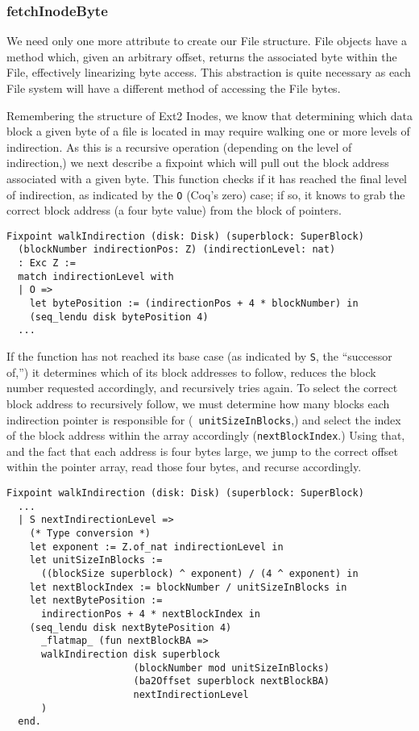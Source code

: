 \documentclass[nocopyrightspace]{sigplanconf}
\begin{document}
\subsubsection{fetchInodeByte}

We need only one more attribute to create our File structure. File objects
have a method which, given an arbitrary offset, returns the associated byte
within the File, effectively linearizing byte access. This abstraction is
quite necessary as each File system will have a different method of accessing
the File bytes.

Remembering the structure of Ext2 Inodes, we know that determining which data
block a given byte of a file is located in may require walking one or more
levels of indirection. As this is a recursive operation (depending on the
level of indirection,) we next describe a fixpoint which will pull out the
block address associated with a given byte. This function checks if it has
reached the final level of indirection, as indicated by the {\tt O} (Coq's
zero) case; if so, it knows to grab the correct block address (a four byte
value) from the block of pointers.

\begin{lstlisting}
Fixpoint walkIndirection (disk: Disk) (superblock: SuperBlock)
  (blockNumber indirectionPos: Z) (indirectionLevel: nat) 
  : Exc Z :=
  match indirectionLevel with
  | O => 
    let bytePosition := (indirectionPos + 4 * blockNumber) in
    (seq_lendu disk bytePosition 4)
  ...
\end{lstlisting}

If the function has not reached its base case (as indicated by {\tt S}, the
``successor of,'') it determines which of its block addresses to follow,
reduces the block number requested accordingly, and recursively tries again.
To select the correct block address to recursively follow, we must determine
how many blocks each indirection pointer is responsible for ({\tt
unitSizeInBlocks},) and select the index of the block address within the array
accordingly ({\tt nextBlockIndex}.) Using that, and the fact that each address
is four bytes large, we jump to the correct offset within the pointer array,
read those four bytes, and recurse accordingly.

\begin{lstlisting}
Fixpoint walkIndirection (disk: Disk) (superblock: SuperBlock)
  ...
  | S nextIndirectionLevel =>
    (* Type conversion *)
    let exponent := Z.of_nat indirectionLevel in
    let unitSizeInBlocks := 
      ((blockSize superblock) ^ exponent) / (4 ^ exponent) in
    let nextBlockIndex := blockNumber / unitSizeInBlocks in
    let nextBytePosition := 
      indirectionPos + 4 * nextBlockIndex in
    (seq_lendu disk nextBytePosition 4) 
      _flatmap_ (fun nextBlockBA =>
      walkIndirection disk superblock 
                      (blockNumber mod unitSizeInBlocks)
                      (ba2Offset superblock nextBlockBA)
                      nextIndirectionLevel
      )
  end.
\end{lstlisting}
\end{document}
